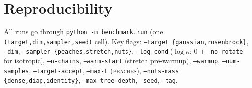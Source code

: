 \documentclass[11pt]{article}
\begin{document}
\section{Reproducibility}\label{sec:repro}

All runs go through \texttt{python -m benchmark.run} (one
\texttt{(target,dim,sampler,seed)} cell). Key flags:
\texttt{--target \{gaussian,rosenbrock\}}, \texttt{--dim}, \texttt{--sampler
\{peaches,stretch,nuts\}}, \texttt{--log-cond} ($\log\kappa$; $0$ + \texttt{--no-rotate}
for isotropic), \texttt{--n-chains}, \texttt{--warm-start} (stretch pre-warmup),
\texttt{--warmup}, \texttt{--num-samples}, \texttt{--target-accept},
\texttt{--max-L} (\textsc{peaches}), \texttt{--nuts-mass \{dense,diag,identity\}},
\texttt{--max-tree-depth}, \texttt{--seed}, \texttt{--tag}.
\end{document}
